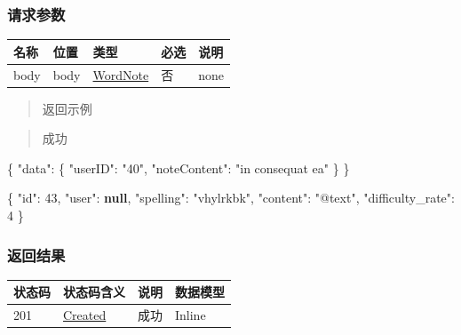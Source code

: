 \documentclass[
]{article}
\newenvironment{Shaded}{}{}
\newcommand{\DataTypeTok}[1]{\textcolor[rgb]{0.56,0.13,0.00}{#1}}
\newcommand{\DecValTok}[1]{\textcolor[rgb]{0.25,0.63,0.44}{#1}}
\newcommand{\FunctionTok}[1]{\textcolor[rgb]{0.02,0.16,0.49}{#1}}
\newcommand{\KeywordTok}[1]{\textcolor[rgb]{0.00,0.44,0.13}{\textbf{#1}}}
\newcommand{\StringTok}[1]{\textcolor[rgb]{0.25,0.44,0.63}{#1}}
\begin{document}
\hypertarget{ux8bf7ux6c42ux53c2ux6570-3}{%
\subsubsection{请求参数}\label{ux8bf7ux6c42ux53c2ux6570-3}}

\begin{longtable}[]{@{}lllll@{}}
\toprule
名称 & 位置 & 类型 & 必选 & 说明 \\
\midrule
\endhead
body & body & \protect\hyperlink{schemawordnote}{WordNote} & 否 &
none \\
\bottomrule
\end{longtable}

\begin{quote}
返回示例
\end{quote}

\begin{quote}
成功
\end{quote}

\begin{Shaded}
\begin{Highlighting}[]
\FunctionTok{\{}
  \DataTypeTok{"data"}\FunctionTok{:} \FunctionTok{\{}
    \DataTypeTok{"userID"}\FunctionTok{:} \StringTok{"40"}\FunctionTok{,}
    \DataTypeTok{"noteContent"}\FunctionTok{:} \StringTok{"in consequat ea"}
  \FunctionTok{\}}
\FunctionTok{\}}
\end{Highlighting}
\end{Shaded}

\begin{Shaded}
\begin{Highlighting}[]
\FunctionTok{\{}
  \DataTypeTok{"id"}\FunctionTok{:} \DecValTok{43}\FunctionTok{,}
  \DataTypeTok{"user"}\FunctionTok{:} \KeywordTok{null}\FunctionTok{,}
  \DataTypeTok{"spelling"}\FunctionTok{:} \StringTok{"vhylrkbk"}\FunctionTok{,}
  \DataTypeTok{"content"}\FunctionTok{:} \StringTok{"@text"}\FunctionTok{,}
  \DataTypeTok{"difficulty\_rate"}\FunctionTok{:} \DecValTok{4}
\FunctionTok{\}}
\end{Highlighting}
\end{Shaded}

\hypertarget{ux8fd4ux56deux7ed3ux679c-3}{%
\subsubsection{返回结果}\label{ux8fd4ux56deux7ed3ux679c-3}}

\begin{longtable}[]{@{}llll@{}}
\toprule
状态码 & 状态码含义 & 说明 & 数据模型 \\
\midrule
\endhead
201 & \href{https://tools.ietf.org/html/rfc7231\#section-6.3.2}{Created}
& 成功 & Inline \\
\bottomrule
\end{longtable}
\end{document}
